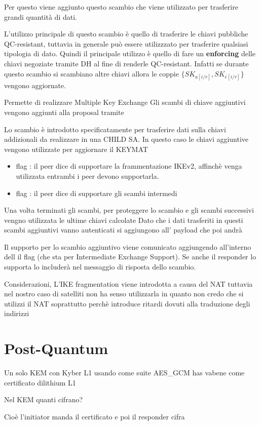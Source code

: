 Per questo viene aggiunto questo scambio che viene utilizzato per trasferire grandi quantità di dati.

L'utilizzo principale di questo scambio è quello di trasferire le chiavi pubbliche QC-resistant, tuttavia in generale può essere utilizzzato per trasferire qualsiasi tipologia di dato.
Quindi il principale utilizzo è quello di fare un \textbf{enforcing} delle chiavi negoziate tramite DH al fine di renderle QC-resistant. Infatti se durante questo scambio si scambiano 
altre chiavi allora le coppie $\{SK_{a[i/r]}, SK_{e[i/r]}\}$ vengono aggiornate.

Permette di realizzare Multiple Key Exchange
Gli scambi di chiave aggiuntivi vengono aggiunti alla proposal tramite 



Lo scambio  è introdotto specificatamente per trasferire dati sulla chiavi addizionali da realizzare in una CHILD SA.
In questo caso le chiavi aggiuntive vengono utilizzate per aggiornare il KEYMAT



\begin{itemize}
    \item flag : il peer dice di supportare la frammentazione IKEv2, affinchè venga utilizzata entrambi i peer devono supportarla.
    \item flag : il peer dice di supportare gli scambi intermedi
\end{itemize}

Una volta terminati gli scambi, per proteggere lo scambio  e gli scambi successivi vengno utilizzata le ultime chiavi calcolate
Dato che i dati trasferiti in questi scambi aggiuntivi vanno autenticati si aggiungono all' payload che poi andrà 



Il supporto per lo scambio aggiuntivo viene comunicato aggiungendo all'interno
dell  il flag  (che sta per
Intermediate Exchange Support).
Se anche il responder lo supporta lo includerà nel messaggio di risposta dello
scambio.




Considerazioni, L'IKE fragmentation viene introdotta a causa del NAT tuttavia nel nostro caso di satelliti non ha senso utilizzarla in quanto non credo che si utilizzi
il NAT soprattutto perchè introduce ritardi dovuti alla traduzione degli indirizzi



\section{Post-Quantum}

Un solo KEM con Kyber L1 usando come suite AES\_GCM has vabene come certificato dilithium L1

Nel KEM quanti cifrano?

Cioè l'initiator manda il certificato e poi il responder cifra 
